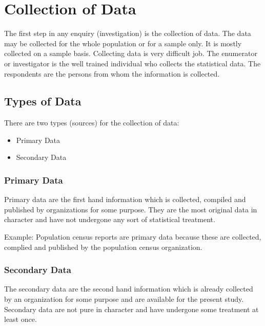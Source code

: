 \documentclass[
]{book}
\providecommand{\tightlist}{%
  \setlength{\itemsep}{0pt}\setlength{\parskip}{0pt}}
\begin{document}
\section{Collection of Data}\label{collection-of-data}

The first step in any enquiry (investigation) is the collection of data.
The data may be collected for the whole population or for a sample only.
It is mostly collected on a sample basis. Collecting data is very
difficult job. The enumerator or investigator is the well trained
individual who collects the statistical data. The respondents are the
persons from whom the information is collected.

\subsection{Types of Data}\label{types-of-data}

There are two types (sources) for the collection of data:

\begin{itemize}
\tightlist
\item
  Primary Data\\
\item
  Secondary Data
\end{itemize}

\subsubsection{Primary Data}\label{primary-data}

Primary data are the first hand information which is collected, compiled
and published by organizations for some purpose. They are the most
original data in character and have not undergone any sort of
statistical treatment.

Example: Population census reports are primary data because these are
collected, complied and published by the population census organization.

\subsubsection{Secondary Data}\label{secondary-data}

The secondary data are the second hand information which is already
collected by an organization for some purpose and are available for the
present study. Secondary data are not pure in character and have
undergone some treatment at least once.
\end{document}
